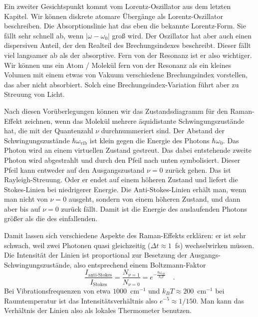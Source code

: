 \begin{marginfigure}
\caption{Der dispersive Anteil des Lorentz-Oszillators fällt langsamer ab als der absorptive. }
\end{marginfigure}


Ein zweiter Gesichtspunkt kommt vom Lorentz-Oszillator aus dem letzten Kapitel. Wir können diskrete atomare Übergänge als Lorentz-Oszillator beschreiben. Die Absorptionslinie hat das eben die bekannte Lorentz-Form. Sie fällt sehr schnell ab, wenn $| \omega  - \omega_0 |$ groß wird. Der Oszillator hat aber auch einen dispersiven Anteil, der den Realteil des Brechungsindexes beschreibt. Dieser fällt viel langsamer ab als der absorptive. Fern von der Resonanz ist er also wichtiger. Wir können uns ein Atom / Molekül fern von der Resonanz als ein kleines Volumen mit einem etwas von Vakuum verschiedene Brechungsindex vorstellen, das aber nicht absorbiert. Solch eine Brechungsindex-Variation führt aber zu Streuung von Licht.

\begin{marginfigure}%
\caption{Stokes- und Anti-Stokes-Streuung über einen virtuellen Zustand (strichliert). Die spektrale Position de Rayleigh-Linie entspricht der des einfallenden Lasers.}
\end{marginfigure}
 

Nach diesen Vorüberlegungen können wir das Zustandsdiagramm für den Raman-Effekt zeichnen, wenn das Molekül mehrere äquidistante Schwingungszustände hat, die mit der Quantenzahl $\nu$ durchnummeriert sind. Der Abstand der Schwingungszustände $\hbar \omega_\text{vib}$ ist klein gegen die Energie des Photons $\hbar \omega_0$. Das Photon wird an einem virtuellen Zustand gestreut. Das dabei entstehende zweite Photon wird abgestrahlt und durch den Pfeil nach unten symbolisiert. Dieser Pfeil kann entweder auf den Ausgangszustand $\nu = 0$ zurück gehen. Das ist Rayleigh-Streuung. Oder er endet auf einem höheren Zustand und liefert die Stokes-Linien bei niedrigerer Energie. Die Anti-Stokes-Linien erhält man, wenn man nicht von $\nu = 0$ ausgeht, sondern von einem höheren Zustand, und dann aber bis auf $\nu = 0$ zurück fällt. Damit ist die Energie des auslaufenden Photons größer als die des einfallenden.



Damit lassen sich verschiedene Aspekte des Raman-Effekts erklären: er ist sehr schwach, weil zwei Photonen quasi gleichzeitig ($\Delta t \approx 1$~fs) wechselwirken müssen. Die Intensität der Linien ist proportional zur Besetzung der Ausgangs-Schwingungszustände, also entsprechend einem Boltzmann-Faktor
\begin{equation}
\frac{I_\text{anti-Stokes}}{I_\text{Stokes}} = 
\frac{N_{\nu = 1}}{N_{\nu = 0}} =
 e^{- \frac{\hbar \omega_\text{vib}}{k_b T}} \quad .
\end{equation}
Bei Vibrationsfrequenzen von etwa $1000$~cm$^{-1}$ und $k_B T \approx 200 $~cm$^{-1}$ bei Raumtemperatur ist das Intensitätsverhältnis also $e^{-5} \approx 1 /150$. Man kann das Verhältnis der Linien also als lokales Thermometer benutzen.

